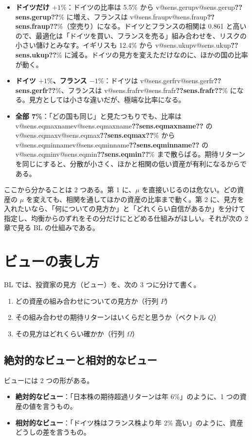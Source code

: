 \documentclass[xelatex,ja=standard,jafont=hiragino-pron,a4paper,11pt,openany]{bxjsreport}
\makeatletter
\newcommand{\V}[1]{\ifcsname v@#1\endcsname\csname v@#1\endcsname\else\textbf{??#1??}\fi}
\makeatother
\begin{document}
\begin{itemize}
\item \textbf{ドイツだけ $+1\%$}：ドイツの比率は 5.5\% から \V{sens.gerup}\% に増え、フランスは \V{sens.fraup}\%（空売り）になる。ドイツとフランスの相関は 0.861 と高いので、最適化は「ドイツを買い、フランスを売る」組み合わせを、リスクの小さい儲けとみなす。イギリスも 12.4\% から \V{sens.ukup}\% に減る。ドイツの見方を変えただけなのに、ほかの国の比率が動く。
\item \textbf{ドイツ $+1\%$、フランス $-1\%$}：ドイツは \V{sens.gerfr}\%、フランスは \V{sens.frafr}\% になる。見方としては小さな違いだが、極端な比率になる。
\item \textbf{全部 7\%}：「どの国も同じ」と見たつもりでも、比率は \V{sens.eqmaxname} の \V{sens.eqmax}\% から \V{sens.eqminname} の \V{sens.eqmin}\% まで散らばる。期待リターンを同じにすると、分散が小さく、ほかと相関の低い資産が有利になるからである。
\end{itemize}

ここから分かることは 2 つある。第 1 に、$\mu$ を直接いじるのは危ない。どの資産の $\mu$ を変えても、相関を通してほかの資産の比率まで動く。第 2 に、見方を入れたいなら、「何についての見方か」と「どれくらい自信があるか」を分けて指定し、均衡からのずれをその分だけにとどめる仕組みがほしい。それが次の 2 章で見る BL の仕組みである。

\chapter{ビューの表し方}\label{ch:views}

BL では、投資家の見方（ビュー）を、次の 3 つに分けて書く。

\begin{enumerate}
\item どの資産の組み合わせについての見方か（行列 $P$）
\item その組み合わせの期待リターンはいくらだと思うか（ベクトル $Q$）
\item その見方はどれくらい確かか（行列 $\Omega$）
\end{enumerate}

\section{絶対的なビューと相対的なビュー}

ビューには 2 つの形がある。

\begin{itemize}
\item \textbf{絶対的なビュー}：「日本株の期待超過リターンは年 6\%」のように、1 つの資産の値を言うもの。
\item \textbf{相対的なビュー}：「ドイツ株はフランス株より年 2\% 高い」のように、資産どうしの差を言うもの。
\end{itemize}
\end{document}
